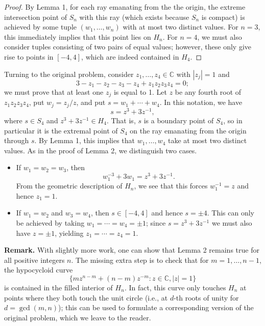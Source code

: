 \documentclass[amssymb,twocolumn,pra,10pt,aps]{revtex4-1}
\newcommand{\CC}{\mathbb{C}}
\begin{document}
\begin{itemize}
\begin{proof}
By Lemma 1, for each ray emanating from the the origin, the extreme intersection point of $S_n$ with this ray (which exists because $S_n$ is compact) is achieved by some tuple $(w_1,\dots,w_n)$ with at most two distinct values.
For $n=3$, this immediately implies that this point lies on $H_n$. For $n=4$, we must also consider tuples consisting of two pairs of equal values; however, these only give rise to points in $[-4, 4]$, which are indeed contained in $H_4$.
\end{proof}

Turning to the original problem, consider $z_1,\dots,z_4 \in \CC$ with $|z_j| = 1$ and 
\[
3 - z_1 - z_2 - z_3 - z_4 + z_1 z_2 z_3 z_4 = 0;
\]
we must prove that at least one $z_j$ is equal to 1.
Let $z$ be any fourth root of $z_1 z_2 z_3 z_4$,
put $w_j = z_j/z$, and put $s = w_1 + \cdots + w_4$. In this notation, we have
\[
s = z^3 + 3z^{-1},
\]
where $s \in S_4$ and $z^3 + 3z^{-1} \in H_4$. That is, $s$ is a boundary point of $S_4$, so in particular it is the extremal point of $S_4$ on the ray emanating from the origin through $s$.
By Lemma 1, this implies that $w_1,\dots,w_4$ take at most two distinct values. As in the proof of Lemma 2, we distinguish two cases.
\begin{itemize}
\item
If $w_1 = w_2 = w_3$, then
\[
w_1^{-3} + 3w_1 = z^3 + 3z^{-1}.
\]
From the geometric description of $H_n$, we see that this forces $w_1^{-1} = z$ and hence $z_1 = 1$.

\item
If $w_1 = w_2$ and $w_3 = w_4$, then $s \in [-4, 4]$ and hence $s = \pm 4$. This can only be achieved by taking $w_1 = \cdots = w_4 = \pm 1$;
since $s = z^3 + 3z^{-1}$ we must also have $z = \pm 1$, yielding $z_1 = \cdots = z_4 = 1$.
\end{itemize}

\noindent
\textbf{Remark.}
With slightly more work, one can show that Lemma 2 remains true for all positive integers $n$.
The missing extra step is to check that for $m=1,\dots,n-1$, the hypocycloid curve
\[
\{m z^{n-m} + (n-m) z^{-m}: z \in \CC, |z| = 1\}
\]
is contained in the filled interior of $H_n$. In fact, this curve only touches $H_n$ at points where they both touch the unit circle (i.e., at $d$-th roots of unity for $d = \gcd(m,n)$);
this can be used to formulate a corresponding version of the original problem, which we leave to the reader.


\end{itemize}
\end{document}
